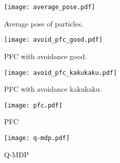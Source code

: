 \begin{figure}[tbp]
  \begin{center}
    \texttt{[image: average\_pose.pdf]}
    \caption{Average pose of particles.}
    \label{fig:average pose}
  \end{center}
\end{figure}

\begin{figure}[tbp]
  \begin{center}
    \texttt{[image: avoid\_pfc\_good.pdf]}
    \caption{PFC with avoidance good.}
    \label{fig:avoid pfc good}
  \end{center}
\end{figure}

\begin{figure}[tbp]
  \begin{center}
    \texttt{[image: avoid\_pfc\_kakukaku.pdf]}
    \caption{PFC with avoidance kakukaku.}
    \label{fig:avoid pfc kakukaku}
  \end{center}
\end{figure}

\begin{figure}[tbp]
  \begin{center}
    \texttt{[image: pfc.pdf]}
    \caption{PFC}
    \label{fig:pfc}
  \end{center}
\end{figure}

\begin{figure}[tbp]
  \begin{center}
    \texttt{[image: q-mdp.pdf]}
    \caption{Q-MDP}
    \label{fig:q-mdp}
  \end{center}
\end{figure}

